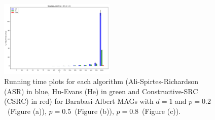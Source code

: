 \documentclass[a4paper]{article}
\begin{document}
\begin{figure}[htbp]
	\centering
	\hfill
	
	\includegraphics[width=0.49\textwidth]{figures/Figure_18.png}
	
	\caption{Running time plots for each algorithm (Ali-Spirtes-Richardson (ASR) in blue, Hu-Evans (He) in green and Constructive-SRC (CSRC) in red) for Barabasi-Albert MAGs with $d=1$ and $p=0.2$~(Figure (a)), $p=0.5$~(Figure (b)), $p=0.8$~(Figure (c)).}
	\label{fig:sf-1-ap}
\end{figure}
\end{document}
